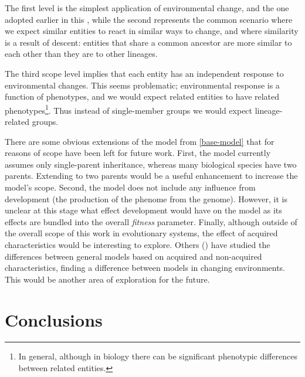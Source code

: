 The first level is the simplest application of environmental change, and the one adopted earlier in this , while the second represents the common scenario where we expect similar entities to react in similar ways to change, and where similarity is a result of descent: entities that share a common ancestor are more similar to each other than they are to other lineages. 

The third scope level implies that each entity has an independent response to environmental changes. This seems problematic; environmental response is a function of phenotypes, and we would expect related entities to have related phenotypes\footnote{In general, although in biology there can be significant phenotypic differences between related entities.}. Thus instead of single-member groups we would expect lineage-related groups.

There are some obvious extensions of the model from \cref{base-model} that for reasons of scope have been left for future work. First, the model currently assumes only single-parent inheritance, whereas many biological species have two parents. Extending to two parents would be a useful enhancement to increase the model's scope. Second, the model does not include any influence from development (the production of the phenome from the genome). However, it is unclear at this stage what effect development would have on the model as its effects are bundled into the overall \emph{fitness} parameter. Finally, although outside of the overall scope of this work in evolutionary systems, the effect of acquired characteristics would be interesting to explore. Others (\eg \textcite{Gaucherel2012,Paenke:2007ie,Sasaki:2000dq}) have studied the differences between general models based on acquired and non-acquired characteristics, finding a difference between models in changing environments. This would be another area of exploration for the future.

\section{Conclusions}

